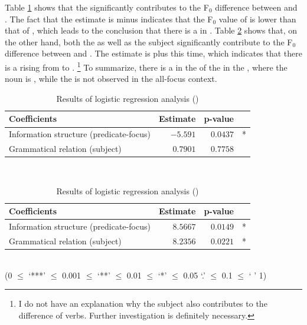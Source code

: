 Table \ref{Pitchv1n3GlmT} shows that
the  significantly contributes to
the F$_{0}$ difference between  and .
The fact that the estimate is minus indicates that the F$_{0}$ value of  is lower than that of ,
which leads to the conclusion that there is a  in .
Table \ref{Pitchv2v1GlmT} shows that, on the other hand,
both the  as well as the subject significantly contribute to the F$_{0}$ difference between  and .
The estimate is plus this time,
which indicates that there is a  rising from  to .%
	\footnote{I do not have an explanation why the subject also contributes to the  difference of verbs.
	Further investigation is definitely necessary.}
To summarize,
there is a  in the  of the  in the , where the noun is ,
while the  is not observed in the all-focus context.


\begin{table}
\centering
\caption{Results of logistic regression analysis ()}
\begin{tabular}{lrrr}
\toprule
Coefficients  & Estimate & p-value & \\
\midrule
 Information structure (predicate-focus)          & $-5.591$   & $0.0437$  & *  \\
 Grammatical relation (subject)          & $0.7901$   & $0.7758$  &   \\
\bottomrule
\end{tabular} \\
\label{Pitchv1n3GlmT}
\end{table}

\begin{table}
\centering
\caption{Results of logistic regression analysis ()}
\begin{tabular}{lrrr}
\toprule
Coefficients  & Estimate & p-value & \\
\midrule
 Information structure (predicate-focus)    & $8.5667$   & $0.0149$  & *  \\
 Grammatical relation (subject)     & $8.2356$   & $0.0221$  & *  \\
\bottomrule
\end{tabular} \\
\hfill{(0 $\le$ `***' $\le$ 0.001 $\le$ `**' $\le$ 0.01 $\le$ `*' $\le$ 0.05 `.' $\le$ 0.1 $\le$ ` ' 1)}
\label{Pitchv2v1GlmT}
\end{table}


